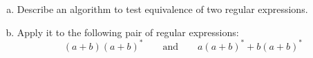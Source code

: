 \documentclass[a4paper,12pt]{amsart}
\begin{document}
\medskip\begin{problem}

    \phantom{}

    \medskip

    \begin{enumerate}[(a)]\setlength\itemsep{12pt}
        \item Describe an algorithm to test equivalence of two regular expressions.
        \item Apply it to the following pair of regular expressions:
        $$
        (a + b)(a + b)^* \qquad\text{and}\qquad a(a + b)^* + b(a + b)^*
        $$
    \end{enumerate}
    
\end{problem}
\end{document}
